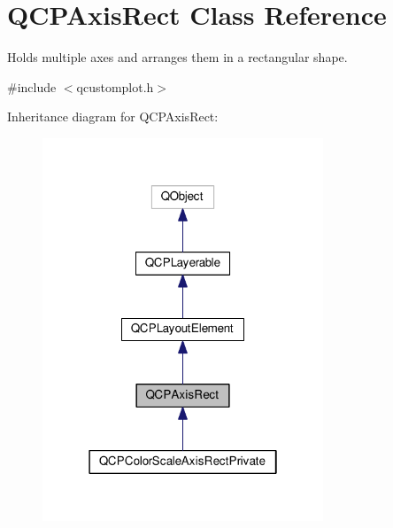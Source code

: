 \hypertarget{classQCPAxisRect}{}\section{Q\+C\+P\+Axis\+Rect Class Reference}
\label{classQCPAxisRect}


Holds multiple axes and arranges them in a rectangular shape.  




{\ttfamily \#include $<$qcustomplot.\+h$>$}



Inheritance diagram for Q\+C\+P\+Axis\+Rect\+:
\nopagebreak
\begin{figure}[H]
\begin{center}
\leavevmode
\includegraphics[width=238pt]{classQCPAxisRect__inherit__graph}
\end{center}
\end{figure}


